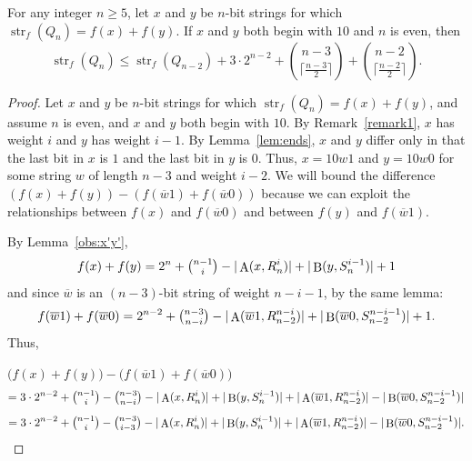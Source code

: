 \documentclass[10pt,a4paper]{amsart}
\DeclareMathOperator{\Prec}{B}
\DeclareMathOperator{\Succ}{A}
\DeclareMathOperator{\str}{str}
\begin{document}
\begin{theorem}\label{thm:both10even} For any integer $n \geq 5$, let $x$ and $y$ be $n$-bit strings for which $\str_f(Q_{n}) = f(x)+f(y)$.  If $x$ and $y$ both begin with $10$ and $n$ is even, then $$\str_f(Q_{n}) \leq \str_f(Q_{n-2}) + 3 \cdot 2^{n-2} + \binom{n-3}{\lceil \frac{n-3}{2}\rceil}+\binom{n-2}{\lceil \frac{n-2}{2}\rceil}.$$ \end{theorem} 

\begin{proof} Let $x$ and $y$ be $n$-bit strings for which $\str_f(Q_{n}) = f(x)+f(y)$, and assume $n$ is even, and $x$ and $y$ both begin with $10$.  By Remark~\ref{remark1}, $x$ has weight $i$ and $y$ has weight $i-1$.  By Lemma~\ref{lem:ends}, $x$ and $y$ differ only in that the last bit in $x$ is $1$ and the last bit in $y$ is $0$.  Thus, $x = 10w1$ and $y=10w0$ for some string $w$ of length $n-3$ and weight $i-2$.  We will bound the difference $(f(x)+f(y)) - (f(\overline{w}1)+f(\overline{w}0))$ because we can exploit the relationships between $f(x)$ and $f(\overline{w}0)$ and between $f(y)$ and $f(\overline{w}1)$.  

By Lemma~\ref{obs:x'y'}, $$f(x)+f(y) = 2^{n}+\tbinom{n-1}{i}-|\Succ(x,R_{n}^i)|+|\Prec(y,S_{n}^{i-1})|+1$$ and since $\overline{w}$ is an $(n-3)$-bit string of weight $n-i-1$, by the same lemma: $$f(\overline{w}1)+f(\overline{w}0)=2^{n-2} + \tbinom{n-3}{n-i}-|\Succ(\overline{w}1,R_{n-2}^{n-i})|+|\Prec(\overline{w}0,S_{n-2}^{n-i-1})|+1.$$  Thus,\medskip 

\noindent $\Big(f(x)+f(y)\Big) - \Big(f(\overline{w}1)+f(\overline{w}0)\Big)$ $$=3 \cdot 2^{n-2}+\tbinom{n-1}{i}-\tbinom{n-3}{n-i} -|\Succ(x,R_{n}^i)|+|\Prec(y,S_{n}^{i-1})| +|\Succ(\overline{w}1,R_{n-2}^{n-i})|-|\Prec(\overline{w}0,S_{n-2}^{n-i-1})|$$ \begin{equation} =3 \cdot 2^{n-2} + \tbinom{n-1}{i}-\tbinom{n-3}{i-3}
-|\Succ(x,R_{n}^i)|+|\Prec(y,S_{n}^{i-1})|+|\Succ(\overline{w}1,R_{n-2}^{n-i})|-|\Prec(\overline{w}0,S_{n-2}^{n-i-1})|.
\label{eqtogether} \end{equation}

\bigskip


\end{proof}
\end{document}
